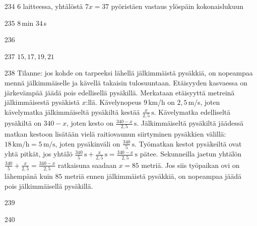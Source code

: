 \begin{Vastaus}{234}
$6$ laitteessa, yhtälöstä $7x=37$ pyöristäen vastaus ylöspäin kokonaislukuun
	
\end{Vastaus}
\begin{Vastaus}{235}
$8$\,min $34$\,s
	
\end{Vastaus}
\begin{Vastaus}{236}
	
\end{Vastaus}
\begin{Vastaus}{237}
	 $15, 17, 19, 21$
	
\end{Vastaus}
\begin{Vastaus}{238}
	Tilanne: jos kohde on tarpeeksi lähellä jälkimmäistä pysäkkiä, on nopeampaa mennä jälkimmäiselle ja kävellä takaisin tulosuuntaan. Etäisyyden kasvaessa on järkevämpää jäädä pois edellisellä pysäkillä. Merkataan etäisyyttä metreinä jälkimmäisestä pysäkistä $x$:llä. Kävelynopeus $9$\,km/h on $2,5$\,m/s, joten kävelymatka jälkimmäiseltä pysäkiltä kestää $\frac{x}{2,5}\,\textrm{s}$. Kävelymatka edelliseltä pysäkiltä on $340-x$, joten kesto on $\frac{340-x}{2,5}\,\textrm{s}$. Jälkimmäiseltä pysäkiltä jäädessä matkan kestoon lisätään vielä raitiovaunun siirtyminen pysäkkien välillä: $18\,\textrm{km/h}=5\,\textrm{m/s}$, joten pysäkinväli on $\frac{340}{5}\,\textrm{s}$. Työmatkan kestot pysäkeiltä ovat yhtä pitkät, jos yhtälö $\frac{340}{5}\,\textrm{s}+\frac{x}{2,5}\,\textrm{s}=\frac{340-x}{2,5}\,\textrm{s}$ pätee. Sekunneilla jaetun yhtälön $\frac{340}{5}+\frac{x}{2,5}=\frac{340-x}{2,5}$ ratkaisuna saadaan $x=85$ metriä. Jos siis työpaikan ovi on lähempänä kuin $85$ metriä ennen jälkimmäistä pysäkkiä, on nopeampaa jäädä pois jälkimmäisellä pysäkillä.
	
\end{Vastaus}
\begin{Vastaus}{239}
	
\end{Vastaus}
\begin{Vastaus}{240}
	
\end{Vastaus}
